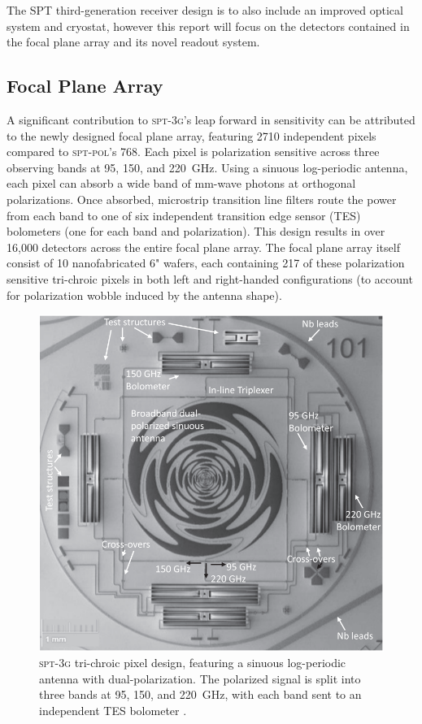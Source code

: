 \documentclass[iop]{emulateapj}
\begin{document}
The SPT third-generation receiver design is to also include an improved optical system and cryostat, however this report will focus on the detectors contained in the focal plane array and its novel readout system.

\subsection{Focal Plane Array}

A significant contribution to \textsc{spt-3g}'s leap forward in sensitivity can be attributed to the newly designed focal plane array, featuring 2710 independent pixels compared to \textsc{spt-pol}'s 768.  Each pixel is polarization sensitive across three observing bands at 95, 150, and 220~GHz.  Using a sinuous log-periodic antenna, each pixel can absorb a wide band of mm-wave photons at orthogonal polarizations.  Once absorbed, microstrip transition line filters route the power from each band to one of six independent transition edge sensor (TES) bolometers (one for each band and polarization).   This design results in over 16,000 detectors across the entire focal plane array.  The focal plane array itself consist of 10 nanofabricated 6" wafers, each containing 217 of these polarization sensitive tri-chroic pixels in both left and right-handed configurations (to account for polarization wobble induced by the antenna shape).

\begin{figure}
	\includegraphics[width=\linewidth]{pixel}
	\centering
	\caption{\textsc{spt-3g} tri-chroic pixel design, featuring a sinuous log-periodic antenna with dual-polarization.  The polarized signal is split into three bands at 95, 150, and 220~GHz, with each band sent to an independent TES bolometer \citep{posada_fabrication_2015}.}
	\label{sptpixel}
\end{figure}
\end{document}
